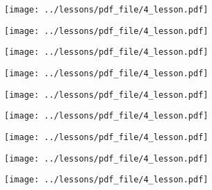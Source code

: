\documentclass[../main/main.tex]{subfiles}
\begin{document}
\begin{figure}[h!]
\centering
\texttt{[image: ../lessons/pdf\_file/4\_lesson.pdf]}
\end{figure}



\newpage

\begin{figure}[h!]
\centering
\texttt{[image: ../lessons/pdf\_file/4\_lesson.pdf]}
\end{figure}

\begin{figure}[h!]
\centering
\texttt{[image: ../lessons/pdf\_file/4\_lesson.pdf]}
\end{figure}


\newpage

\begin{figure}[h!]
\centering
\texttt{[image: ../lessons/pdf\_file/4\_lesson.pdf]}
\end{figure}

\begin{figure}[h!]
\centering
\texttt{[image: ../lessons/pdf\_file/4\_lesson.pdf]}
\end{figure}


\newpage

\begin{figure}[h!]
\centering
\texttt{[image: ../lessons/pdf\_file/4\_lesson.pdf]}
\end{figure}

\begin{figure}[h!]
\centering
\texttt{[image: ../lessons/pdf\_file/4\_lesson.pdf]}
\end{figure}



\newpage

\begin{figure}[h!]
\centering
\texttt{[image: ../lessons/pdf\_file/4\_lesson.pdf]}
\end{figure}

\begin{figure}[h!]
\centering
\texttt{[image: ../lessons/pdf\_file/4\_lesson.pdf]}
\end{figure}


\clearpage
\end{document}
